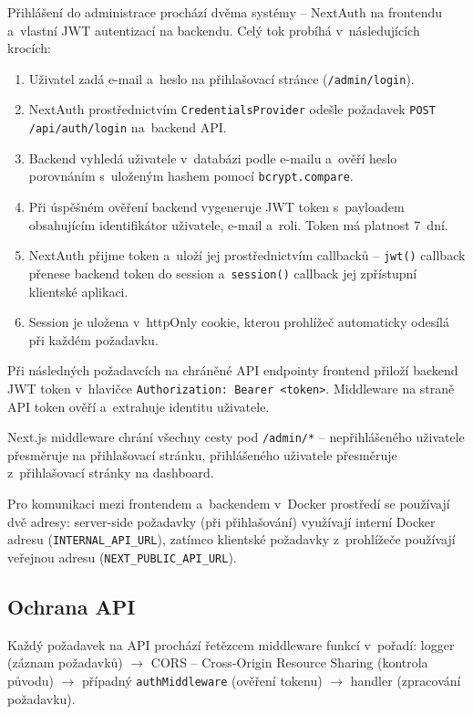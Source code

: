 Přihlášení do administrace prochází dvěma systémy -- NextAuth na frontendu a~vlastní JWT autentizací na backendu. Celý tok probíhá v~následujících krocích:

\begin{enumerate}
    \item Uživatel zadá e-mail a~heslo na přihlašovací stránce (\texttt{/admin/login}).
    \item NextAuth prostřednictvím \texttt{Credentials\-Provider} odešle požadavek \texttt{POST\allowbreak{} /api/\allowbreak auth/\allowbreak login} na~backend API.
    \item Backend vyhledá uživatele v~databázi podle e-mailu a~ověří heslo porovnáním s~uloženým hashem pomocí \texttt{bcrypt.compare}.
    \item Při úspěšném ověření backend vygeneruje JWT token s~payloadem obsahujícím identifikátor uživatele, e-mail a~roli. Token má platnost 7~dní.
    \item NextAuth přijme token a~uloží jej prostřednictvím callbacků -- \texttt{jwt()} callback přenese backend token do session a~\texttt{session()} callback jej zpřístupní klientské aplikaci.
    \item Session je uložena v~httpOnly cookie, kterou prohlížeč automaticky odesílá při každém požadavku.
\end{enumerate}

Při následných požadavcích na chráněné API endpointy frontend přiloží backend JWT token v~hlavičce \texttt{Authorization: Bearer <token>}. Middleware na straně API token ověří a~extrahuje identitu uživatele.

Next.js middleware chrání všechny cesty pod \texttt{/admin/*} -- nepřihlášeného uživatele přesměruje na přihlašovací stránku, přihlášeného uživatele přesměruje z~přihlašovací stránky na dashboard.

Pro komunikaci mezi frontendem a~backendem v~Docker prostředí se používají dvě adresy: server-side požadavky (při přihlašování) využívají interní Docker adresu (\texttt{INTERNAL\_API\_URL}), zatímco klientské požadavky z~prohlížeče používají veřejnou adresu (\texttt{NEXT\_PUBLIC\_API\_URL}).

\subsection{Ochrana API}

Každý požadavek na API prochází řetězcem middleware funkcí v~pořadí: logger (záznam požadavků) $\rightarrow$ CORS -- Cross-Origin Resource Sharing (kontrola původu) $\rightarrow$ případný \texttt{authMiddleware} (ověření tokenu) $\rightarrow$ handler (zpracování požadavku).

